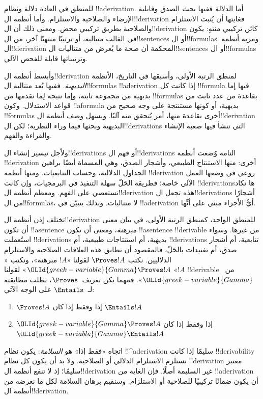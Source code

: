 \documentclass[../../../include/open-logic-section]{subfiles}
\begin{document}
      {}
      {}


للمنطق في العادة دلالة ونظام !!a{derivation}. أما الدلالة ففيها بحث الصدق وقابلية الإرضاء والصلاحية والاستلزام. وأما أنظمة ال!!{derivation} فغايتها أن يُثبت الاستلزام والصلاحية بطريق تركيبي محض. ومعنى ذلك أن ال!!{derivation} كائن تركيبي منتهٍ: يكون في الغالب متتالية، أو ترتيبًا منتهيًا آخر، من ال!!{sentence}s أو ال!!{formula}s. ومزية أنظمة ال!!{derivation} المحكمة أن صحة ما يُعرض من متتاليات ال!!{sentence}s أو ال!!{formula}s وترتيباتها قابلة للفحص الآلي.

وأبسط أنظمة ال!!{derivation} لمنطق الرتبة الأولى، وأسبقها في التاريخ، الأنظمة \emph{البديهية}. ففيها تُعد متتالية ال!!{formula}s
!!a{derivation} إذا كانت كل !!{formula} فيها إما بديهية من مجموعة ثابتة، وإما نتيجة لِما تقدمها من !!{formula}s بقاعدة من عدد ثابت من قواعد الاستدلال. وكون
!!a{formula} بديهية، أو كونها مستنتجة على وجه صحيح من !!{formula}s أخرى بقاعدة منها، أمر يُتحقق منه آليًا. ويسهل وصف أنظمة ال!!{derivation} البديهية وبحثها فيما وراء النظرية؛ لكن ال!!{derivation}s التي تنشأ فيها صعبة الإنشاء والقراءة والفهم.

ولأجل تيسير إنشاء ال!!{derivation}s أو فهم ال!!{derivation}s التامة وُضعت أنظمة
!!{derivation} أخرى: منها الاستنتاج الطبيعي، وأشجار الصدق، وهي المسماة أيضًا براهين الجداول الدلالية، وحساب التتابعيات. ومنها أنظمة
!!{derivation} روعي في وضعها العمل الآلي خاصة؛ فطريقة الحَلّ سهلة التنفيذ في البرمجيات، وإن كانت !!{derivation}sها تكاد تستعصي على الفهم. ومعظم أنظمة ال!!{derivation} هذه تجعل ال!!{derivation}s أشجارًا من ال!!{formula}s، لا متتاليات. وبذلك يتبيّن في
!!a{derivation} أيُّ الأجزاء مبني على أيِّها.

تختلف إذن أنظمة ال!!{derivation} للمنطق الواحد، كمنطق الرتبة الأولى، في بيان معنى أن تكون
!!a{sentence} \emph{مبرهنة}، ومعنى أن تكون
!!a{sentence} !!{derivable} من غيرها. وسواء استُعملت
!!{derivation}s بديهية، أم استنتاجات طبيعية، أم
!!{derivation}s تتابعية، أم أشجار صدق، أم تفنيدات بالحَلّ، فالمقصود أن تطابق هذه العلاقات الصلاحية والاستلزام الدلاليين. نكتب
$\Proves !A$ لقولنا «$!A$ مبرهنة»، ونكتب
«${\OLId{greek-variable}{Gamma}} \Proves !A$» لقولنا «$!A$ !!{derivable} من~${\OLId{greek-variable}{Gamma}}$».
فمهما يكن تعريف~$\Proves$، نطلب مطابقته لـ~$\Entails$ على الوجه الآتي:
\begin{enumerate}
\item $\Proves !A$ إذا وفقط إذا كان $\Entails !A$
\item ${\OLId{greek-variable}{Gamma}} \Proves !A$ إذا وفقط إذا كان ${\OLId{greek-variable}{Gamma}} \Entails !A$
\end{enumerate}
اتجاه «فقط إذا» هو \emph{السلامة}: يكون نظام
!!^a{derivation} سليمًا إذا كانت !!{derivability} تستلزم الاستلزام الدلالي أو الصلاحية. ولا بد أن يكون كل نظام
!!{derivation} معتبر سليمًا؛ إذ لا تنفع أنظمة ال!!{derivation} غير السليمة أصلًا. فإن الغاية من
!!a{derivation} أن يكون ضمانًا تركيبيًا للصلاحية أو الاستلزام. وسنقيم برهان السلامة لكل ما نعرضه من أنظمة ال!!{derivation}.
\end{document}
